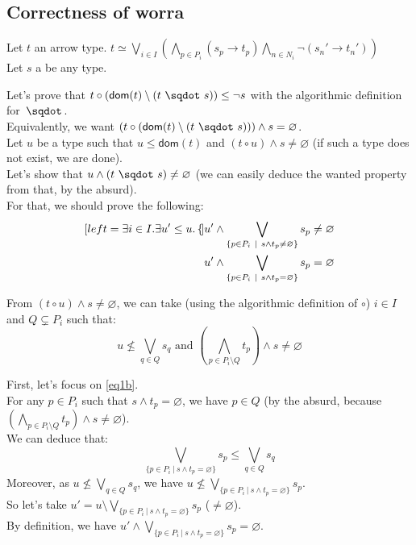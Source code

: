 \documentclass[a4paper]{article}%
\newcommand{\worra}[2]{#1\mathop{\,\sqdot\,} #2}
\newcommand{\apply}[2]{#1\circ#2}
\newcommand{\dom}[1]{\textsf{dom}(#1)}
\newcommand{\alt}{~|~}
\begin{document}
    \subsection{Correctness of worra}
    
    Let $t$ an arrow type. $t \simeq \bigvee_{i\in I}\left(\bigwedge_{p\in P_i}(s_p\to t_p)\bigwedge_{n\in N_i}\neg(s_n'\to t_n')\right)$\\
    Let $s$ a be any type.

    Let's prove that $\apply t {(\dom t \setminus (\worra t s))} \leq \neg s$ with the algorithmic definition for $\worra {} {}$.\\
    Equivalently, we want $(\apply t {(\dom t \setminus (\worra t s))}) \land s = \varnothing$.\\

    Let $u$ be a type such that $u \leq \dom t$ and $(\apply t u) \land s \neq \varnothing$ (if such a type does not exist, we are done).\\
    Let's show that $u \land (\worra t s) \neq \varnothing$ (we can easily deduce the wanted property from that, by the absurd).\\
    For that, we should prove the following:\\

    \begin{subequations}
        \begin{align}[left ={\exists i \in I. \exists u' \leq u. \empheqlbrace}]
          &u' \land \bigvee_{\{p\in P_i\alt s\wedge t_p\not=\varnothing\}}s_p \neq \varnothing\label{eq1a}\\
          &u' \land \bigvee_{\{p \in P_i \alt s \land t_p = \varnothing\}}s_p = \varnothing\label{eq1b}
        \end{align}
    \end{subequations}

  From $(\apply t u) \land s \neq \varnothing$, we can take (using the algorithmic definition of $\circ$) $i \in I$ and $Q \subsetneq P_i$ such that:\\
  \[ u \not\leq\bigvee_{q\in Q}s_q \text{\ \ \ and\ \ \ } (\bigwedge_{p\in P_i\setminus Q}t_p) \land s \neq \varnothing \]

    First, let's focus on \cref{eq1b}.\\
    For any $p \in P_i$ such that $s \land t_p = \varnothing$, we have $p \in Q$ (by the absurd, because $(\bigwedge_{p\in P_i\setminus Q}t_p) \land s \neq \varnothing$).\\
    We can deduce that:
    \[ \bigvee_{\{p \in P_i \alt s \land t_p = \varnothing\}}s_p \leq \bigvee_{q \in Q}s_q \]
    Moreover, as $u \not\leq\bigvee_{q\in Q}s_q$, we have $u \not\leq\bigvee_{\{p \in P_i \alt s \land t_p = \varnothing\}}s_p$.\\
    So let's take $u' = u \setminus \bigvee_{\{p \in P_i \alt s \land t_p = \varnothing\}}s_p$ ($\neq \varnothing$).\\
    By definition, we have $u' \land \bigvee_{\{p \in P_i \alt s \land t_p = \varnothing\}}s_p = \varnothing$.\\
 
\end{document}
